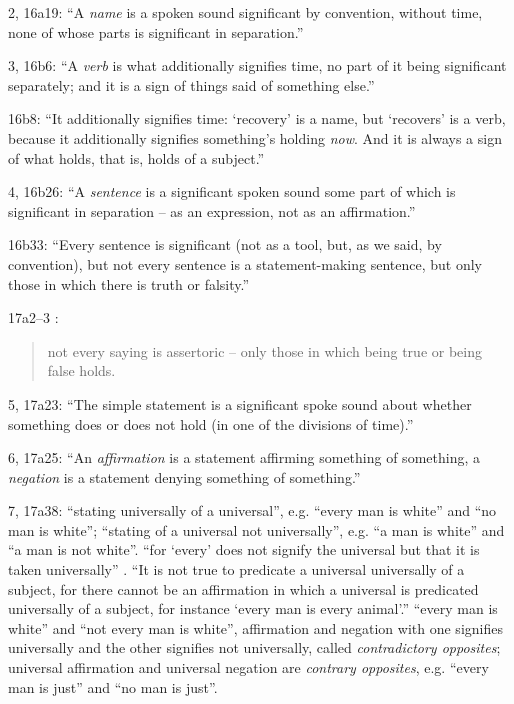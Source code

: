 \documentclass{article}
\begin{document}
2, 16a19: ``A {\em name} is a spoken sound significant by convention,
without time, none of whose parts is significant in separation.'' \cite[p.~43]{ackrill}

3, 16b6: ``A {\em verb} is what additionally signifies time, no part
of it being significant separately; and it is a sign of things
said of something else.'' \cite[p.~44]{ackrill}

16b8: ``It additionally signifies time: `recovery' is a name,
but `recovers' is a verb, because it additionally signifies
something's holding {\em now}. And it is always a sign of what
holds, that is, holds of a subject.'' \cite[p.~44]{ackrill}

4, 16b26: ``A {\em sentence} is a significant spoken sound some part
of which is significant in separation -- as an expression,
not as an affirmation.'' \cite[p.~45]{ackrill}

16b33: ``Every sentence is significant (not as a tool, but,
as we said, by convention), but not every sentence is a
statement-making sentence, but only those in which there
is truth or falsity.'' \cite[p.~45]{ackrill}

17a2--3 \cite[p.~3]{barnes}:

\begin{quote}
not every saying is assertoric -- only those in which being true or being false holds.
\end{quote}

5, 17a23: ``The simple statement is a significant spoke sound
about whether something does or does not hold (in one 
of the divisions of time).'' \cite[p.~46]{ackrill}

6, 17a25: ``An {\em affirmation} is a statement affirming something
of something, a {\em negation} is a statement denying something
of something.'' \cite[p.~47]{ackrill}

7, 17a38: 
\cite[p.~47]{ackrill} ``stating universally of a universal'', e.g. ``every man is white'' and
``no man is white''; ``stating  of a universal  not universally'', e.g.
``a man is white'' and ``a man is not white''.
``for `every' does not signify the universal but that it is taken universally'' \cite[p.~48]{ackrill}.
``It is not true to predicate a universal universally of a subject, for there cannot be
an affirmation in which a universal is predicated universally of a subject,
for instance `every man is every animal'.'' \cite[p.~48]{ackrill}
``every man is white'' and ``not every man is white'', affirmation and negation with
one signifies universally and the other signifies not universally,
called {\em contradictory opposites}; 
universal affirmation and universal negation are {\em contrary opposites}, e.g.
``every man is just'' and ``no man is just''. \cite[p.~48]{ackrill}
\end{document}
